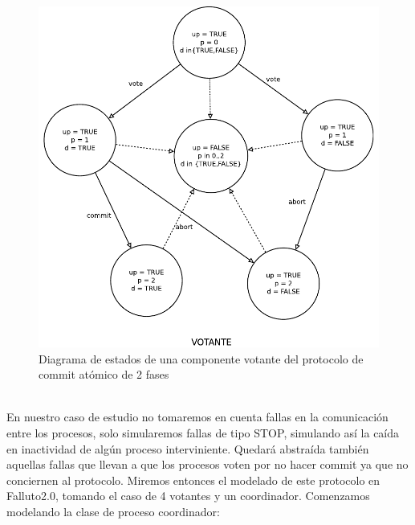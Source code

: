 \documentclass[titlepage, 12pt]{book}
\begin{document}
\begin{figure}[H]
  \centering
    \includegraphics[scale=0.75]{Imagenes/2pcVoter.pdf}
  \caption{Diagrama de estados de una componente votante del protocolo de commit at\'omico de 2 fases}
  \label{2pcv}
\end{figure}
~\\

En nuestro caso de estudio no tomaremos en cuenta fallas en la comunicaci\'on entre los procesos, solo simularemos fallas de tipo STOP, simulando as\'i la ca\'ida en inactividad de alg\'un proceso interviniente. Quedar\'a abstra\'ida tambi\'en aquellas fallas que llevan a que los procesos voten por no hacer commit ya que no conciernen al protocolo. Miremos entonces el modelado de este protocolo en Falluto2.0, tomando el caso de 4 votantes y un coordinador. Comenzamos modelando la clase de proceso coordinador:\\
\end{document}
